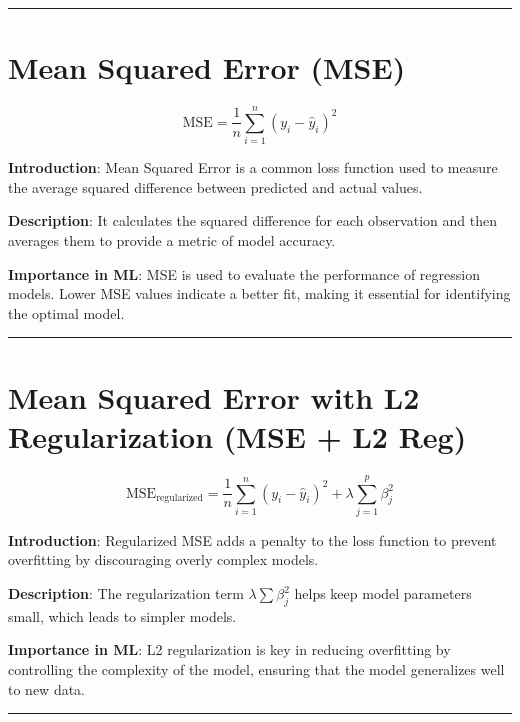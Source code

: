 \documentclass[
  12 pt,
  a4paper,
]{book}
\numberwithin{equation}{section}
\theoremstyle{plain}      %
\theoremstyle{definition} %
\theoremstyle{remark}     %
\theoremstyle{note}         %
\begin{document}
\begin{center}\rule{0.5\linewidth}{0.5pt}\end{center}

\newpage

\hypertarget{mean-squared-error-mse}{%
\chapter{Mean Squared Error (MSE)}\label{mean-squared-error-mse}}

\[
\text{MSE} = \frac{1}{n} \sum_{i=1}^n (y_i - \hat{y}_i)^2
\]

\textbf{Introduction}: Mean Squared Error is a common loss function used
to measure the average squared difference between predicted and actual
values.

\textbf{Description}: It calculates the squared difference for each
observation and then averages them to provide a metric of model
accuracy.

\textbf{Importance in ML}: MSE is used to evaluate the performance of
regression models. Lower MSE values indicate a better fit, making it
essential for identifying the optimal model.

\begin{center}\rule{0.5\linewidth}{0.5pt}\end{center}

\newpage

\hypertarget{mean-squared-error-with-l2-regularization-mse-l2-reg}{%
\chapter{Mean Squared Error with L2 Regularization (MSE + L2
Reg)}\label{mean-squared-error-with-l2-regularization-mse-l2-reg}}

\[
\text{MSE}_{\text{regularized}} = \frac{1}{n} \sum_{i=1}^n (y_i - \hat{y}_i)^2 + \lambda \sum_{j=1}^p \beta_j^2
\]

\textbf{Introduction}: Regularized MSE adds a penalty to the loss
function to prevent overfitting by discouraging overly complex models.

\textbf{Description}: The regularization term \(\lambda \sum \beta_j^2\)
helps keep model parameters small, which leads to simpler models.

\textbf{Importance in ML}: L2 regularization is key in reducing
overfitting by controlling the complexity of the model, ensuring that
the model generalizes well to new data.

\begin{center}\rule{0.5\linewidth}{0.5pt}\end{center}
\end{document}
